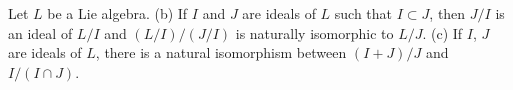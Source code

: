 Let $L$ be a Lie algebra.
(b) If $I$ and $J$ are ideals of $L$ such that $I \subset J$, then $J/I$ is an ideal of $L/I$ and $(L/I)/(J/I)$ is naturally isomorphic to $L/J$.
(c) If $I$, $J$ are ideals of $L$, there is a natural isomorphism between $(I+J)/J$ and $I/(I \cap J)$.
